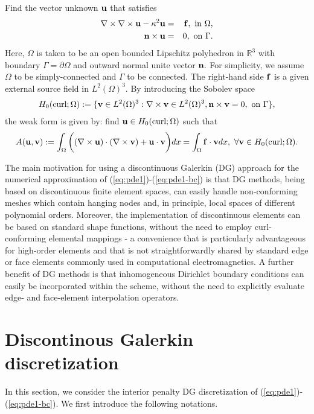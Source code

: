 \documentclass[final,leqno]{siamltex704}
\newcommand{\bn}{{\bf n}}
\newcommand{\bv}{{\bf v}}
\def\bbf{{\bf f}}
\def\bn{{\bf n}}
\def\bu{{\bf u}}
\def\bv{{\bf v}}
\begin{document}
Find the vector unknown $\bu$ that satisfies
\begin{eqnarray}
\nabla\times\nabla\times\bu-\kappa^2\bu &=&\bbf,\mbox{ in }\Omega,\label{eq:pde1}\\
\bn\times\bu &=& 0, \mbox{ on }\Gamma.\label{eq:pde1-bc}
\end{eqnarray}
Here, $\Omega$ is taken to be an open bounded Lipschitz polyhedron in $\mathbb{R}^3$ with boundary $\Gamma=\partial\Omega$ and outward normal unite vector $\bn.$ For simplicity, we assume $\Omega$ to be simply-connected and $\Gamma$ to be connected. The right-hand side $\bbf$ is a given external source field in $L^2(\Omega)^3.$ By introducing the Sobolev space
\begin{eqnarray*}
H_0(\text{curl};\Omega):=\{\bv\in L^2(\Omega)^3:\nabla\times\bv\in L^2(\Omega)^3,\bn\times\bv=0,\mbox{ on }\Gamma\},
\end{eqnarray*}
the weak form is given by: find $\bu\in H_0(\text{curl};\Omega)$ such that
\begin{eqnarray*}
A(\bu,\bv):=\int_{\Omega}\bigg((\nabla\times\bu)\cdot(\nabla\times\bv)+\bu\cdot\bv\bigg)dx=\int_{\Omega}\bbf\cdot\bv dx,\ \forall\bv\in H_0(\text{curl};\Omega).
\end{eqnarray*}

The main motivation for using a discontinuous Galerkin (DG) approach for the numerical approximation of (\ref{eq:pde1})-(\ref{eq:pde1-bc}) is that DG methods, being based on discontinuous finite element spaces, can easily handle non-conforming meshes which contain hanging nodes and, in principle, local spaces of different polynomial orders. Moreover, the implementation of discontinuous elements can be based on standard shape functions, without the need to employ curl-conforming elemental mappings - a convenience that is particularly advantageous for high-order elements and that is not straightforwardly shared by standard edge or face elements commonly used in computational electromagnetics. A further benefit of DG methods is that inhomogeneous Dirichlet boundary conditions can easily be incorporated within the scheme, without the need to explicitly evaluate edge- and face-element interpolation operators.






\section{Discontinous Galerkin discretization}
In this section, we consider the interior penalty DG discretization of (\ref{eq:pde1})-(\ref{eq:pde1-bc}). We first introduce the following notations.
\end{document}
